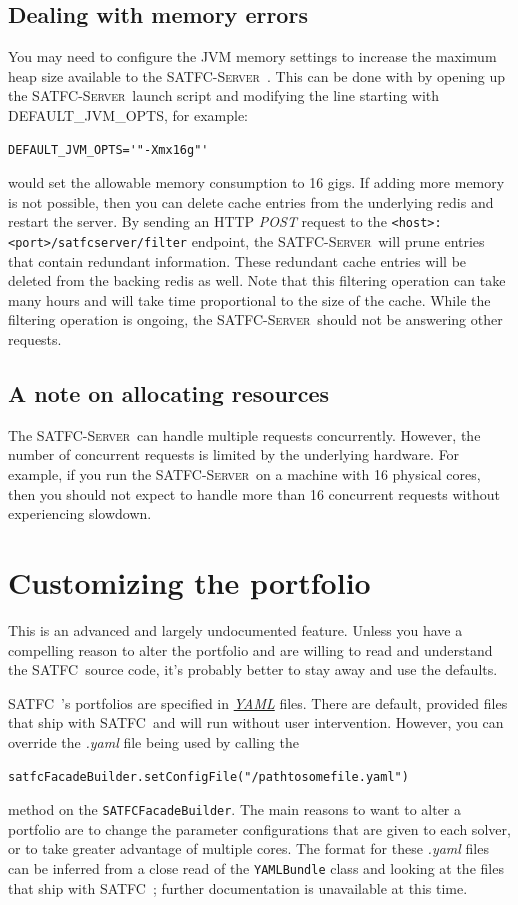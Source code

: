 \documentclass[
10pt, %
letterpaper, %
oneside, %
headinclude,footinclude, %
BCOR5mm, %
needspace, %
]{scrartcl}
\newcommand{\SATFC}{\textsc{SATFC}~}
\newcommand{\SATFCServer}{\textsc{SATFC-Server}~}
\begin{document}
\subsection{Dealing with memory errors}
You may need to configure the JVM memory settings to increase the maximum heap size available to the \SATFCServer. This can be done with by opening up the \SATFCServer launch script and modifying the line starting with DEFAULT\_JVM\_OPTS, for example:
\begin{lstlisting}[style=Bash]
DEFAULT_JVM_OPTS='"-Xmx16g"'
\end{lstlisting}
would set the allowable memory consumption to 16 gigs. If adding more memory is not possible, then you can delete cache entries from the underlying redis and restart the server. By sending an HTTP \emph{POST} request to the \texttt{<host>:<port>/satfcserver/filter} endpoint, the \SATFCServer will prune entries that contain redundant information. These redundant cache entries will be deleted from the backing redis as well. Note that this filtering operation can take many hours and will take time proportional to the size of the cache. While the filtering operation is ongoing, the \SATFCServer should not be answering other requests.

\subsection{A note on allocating resources}
The \SATFCServer can handle multiple requests concurrently. However, the number of concurrent requests is limited by the underlying hardware. For example, if you run the \SATFCServer on a machine with 16 physical cores, then you should not expect to handle more than 16 concurrent requests without experiencing slowdown. 

\section{Customizing the portfolio}\label{sec:customportfolio}
\begin{fwarning}
	This is an advanced and largely undocumented feature. Unless you have a compelling reason to alter the portfolio and are willing to read and understand the \SATFC source code, it's probably better to stay away and use the defaults. 
\end{fwarning}
\SATFC's portfolios are specified in \href{http://yaml.org/}{\emph{YAML}} files. There are default, provided files that ship with \SATFC and will run without user intervention. However, you can override the \emph{.yaml} file being used by calling the 
\begin{verbatim}
satfcFacadeBuilder.setConfigFile("/pathtosomefile.yaml")
\end{verbatim}
method on the \texttt{SATFCFacadeBuilder}. The main reasons to want to alter a portfolio are to change the parameter configurations that are given to each solver, or to take greater advantage of multiple cores. The format for these \emph{.yaml} files can be inferred from a close read of the \texttt{YAMLBundle} class and looking at the files that ship with \SATFC; further documentation is unavailable at this time.
\end{document}
